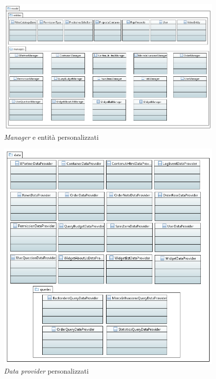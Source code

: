 \begin{figure}[H]
	\centering
	\includegraphics[height=0.9\linewidth,angle=90]{Immagini/p2/manager.png}
	\caption{\textit{Manager} e entità personalizzati}
	\label{fig:manager}
\end{figure}
\begin{figure}[H]
	\centering
	\includegraphics[width=\linewidth]{Immagini/p2/data.png}
	\caption{\textit{Data provider} personalizzati}
	\label{fig:data}
\end{figure}


